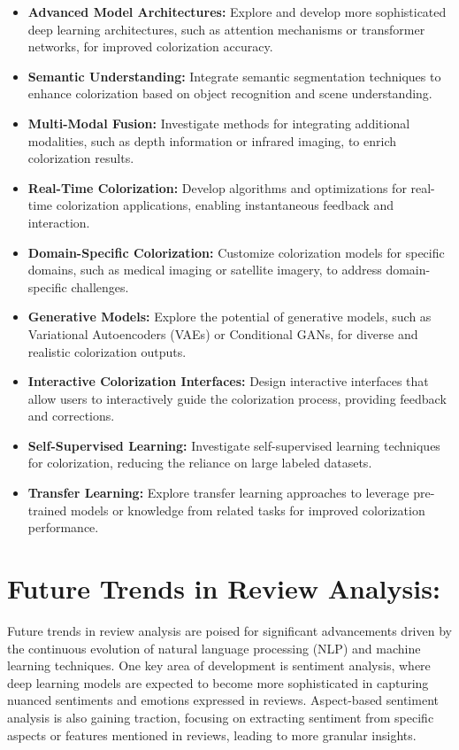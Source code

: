 \begin{itemize}
\item \textbf{Advanced Model Architectures:} Explore and develop more sophisticated deep learning architectures, such as attention mechanisms or transformer networks, for improved colorization accuracy.
\item \textbf{Semantic Understanding:} Integrate semantic segmentation techniques to enhance colorization based on object recognition and scene understanding.

\item \textbf{Multi-Modal Fusion:} Investigate methods for integrating additional modalities, such as depth information or infrared imaging, to enrich colorization results.

\item \textbf{Real-Time Colorization:} Develop algorithms and optimizations for real-time colorization applications, enabling instantaneous feedback and interaction.
\item \textbf{Domain-Specific Colorization:} Customize colorization models for specific domains, such as medical imaging or satellite imagery, to address domain-specific challenges.

\item \textbf{Generative Models:} Explore the potential of generative models, such as Variational Autoencoders (VAEs) or Conditional GANs, for diverse and realistic colorization outputs.

\item \textbf{Interactive Colorization Interfaces:} Design interactive interfaces that allow users to interactively guide the colorization process, providing feedback and corrections.

\item \textbf{Self-Supervised Learning:} Investigate self-supervised learning techniques for colorization, reducing the reliance on large labeled datasets.
\item \textbf{Transfer Learning:} Explore transfer learning approaches to leverage pre-trained models or knowledge from related tasks for improved colorization performance.
\end{itemize}
\clearpage
\section{Future Trends in Review Analysis:}
Future trends in review analysis are poised for significant advancements driven by the continuous evolution of natural language processing (NLP) and machine learning techniques. One key area of development is sentiment analysis, where deep learning models are expected to become more sophisticated in capturing nuanced sentiments and emotions expressed in reviews. Aspect-based sentiment analysis is also gaining traction, focusing on extracting sentiment from specific aspects or features mentioned in reviews, leading to more granular insights.

